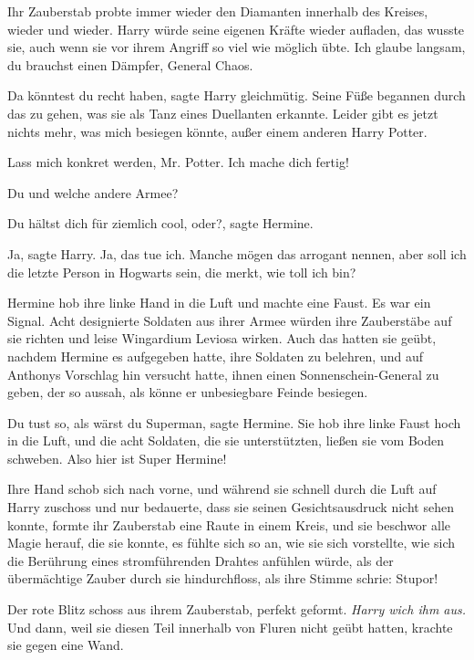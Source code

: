 Ihr Zauberstab probte immer wieder den Diamanten innerhalb des Kreises, wieder
und wieder. Harry würde seine eigenen Kräfte wieder aufladen, das wusste sie,
auch wenn sie vor ihrem Angriff so viel wie möglich übte. \glqq Ich glaube
langsam, du brauchst einen Dämpfer, General Chaos.\grqq{}

\glqq Da könntest du recht haben\grqq{}, sagte Harry gleichmütig. Seine Füße
begannen durch das zu gehen, was sie als Tanz eines Duellanten erkannte. \glqq
Leider gibt es jetzt nichts mehr, was mich besiegen könnte, außer einem anderen
Harry Potter.\grqq{}

\glqq Lass mich konkret werden, Mr. Potter. Ich mache dich fertig!\grqq{}

\glqq Du und welche andere Armee?\grqq{}

\glqq Du hältst dich für ziemlich cool, oder?\grqq{}, sagte Hermine.

\glqq Ja\grqq{}, sagte Harry. \glqq Ja, das tue ich. Manche mögen das arrogant
nennen, aber soll ich die letzte Person in Hogwarts sein, die merkt, wie toll
ich bin?\grqq{}

Hermine hob ihre linke Hand in die Luft und machte eine Faust. Es war ein
Signal. Acht designierte Soldaten aus ihrer Armee würden ihre Zauberstäbe auf
sie richten und leise Wingardium Leviosa wirken. Auch das hatten sie geübt,
nachdem Hermine es aufgegeben hatte, ihre Soldaten zu belehren, und auf Anthonys
Vorschlag hin versucht hatte, ihnen einen Sonnenschein-General zu geben, der so
aussah, als könne er unbesiegbare Feinde besiegen.

\glqq Du tust so, als wärst du Superman\grqq{}, sagte Hermine. Sie hob ihre
linke Faust hoch in die Luft, und die acht Soldaten, die sie unterstützten,
ließen sie vom Boden schweben. \glqq Also hier ist Super Hermine!\grqq{}

Ihre Hand schob sich nach vorne, und während sie schnell durch die Luft auf
Harry zuschoss und nur bedauerte, dass sie seinen Gesichtsausdruck nicht sehen
konnte, formte ihr Zauberstab eine Raute in einem Kreis, und sie beschwor alle
Magie herauf, die sie konnte, es fühlte sich so an, wie sie sich vorstellte, wie
sich die Berührung eines stromführenden Drahtes anfühlen würde, als der
übermächtige Zauber durch sie hindurchfloss, als ihre Stimme schrie: \glqq
Stupor!\grqq{}

Der rote Blitz schoss aus ihrem Zauberstab, perfekt geformt. \emph{Harry wich
ihm aus.} Und dann, weil sie diesen Teil innerhalb von Fluren nicht geübt
hatten, krachte sie gegen eine Wand.

